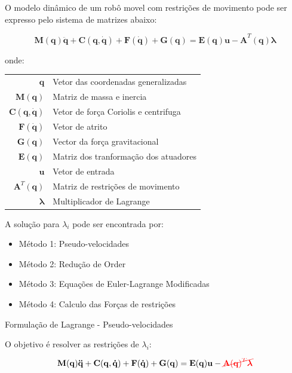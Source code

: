 O modelo dinâmico de um robô movel com restrições de movimento pode ser expresso pelo sistema de matrizes abaixo:

\begin{equation}
    \mathbf{M(q)\ddot{q}+ C(q, \dot{q})+ F(\dot{q})+G(q) = E(q)u -A}^T\mathbf{(q)}\boldsymbol{\lambda}
\end{equation}

onde:
\begin{tabular}{ r | l }
    $\mathbf{q}$               & Vetor das coordenadas generalizadas   \\
    $\mathbf{M(q)}$            & Matriz de massa e inercia             \\
    $\mathbf{C(q, \dot{q})}$   & Vetor de força Coriolis e centrifuga  \\
    $\mathbf{F(\dot{q})}$      & Vetor de atrito                       \\
    $\mathbf{G(q)}$            & Vector da força gravitacional         \\
    $\mathbf{E(q)}$            & Matriz dos tranformação dos atuadores \\
    $\mathbf{u}$               & Vetor de entrada                      \\
    $\mathbf{A}^T\mathbf{(q)}$ & Matriz de restrições de movimento     \\
    $\boldsymbol{\lambda}$     & Multiplicador de Lagrange             \\
\end{tabular}


A solução para $\lambda_i$ pode ser encontrada por:
\begin{itemize}
    \item Método 1: Pseudo-velocidades
    \item Método 2: Redução de Order 
    \item Método 3: Equações de Euler-Lagrange Modificadas 
    \item Método 4: Calculo das Forças de restrições 
\end{itemize}


Formulação de Lagrange - Pseudo-velocidades

O objetivo é resolver as restrições de $\lambda_i$:

\begin{equation}\label{eq:rmrestri}
    \mathbf{M(q)\ddot{q}+ C(q, \dot{q})+ F(\dot{q})+G(q) = E(q)u} - \textcolor{red}{\cancel{\mathbf{A}\mathbf{(q)}^T\boldsymbol{\lambda}}}
\end{equation}

